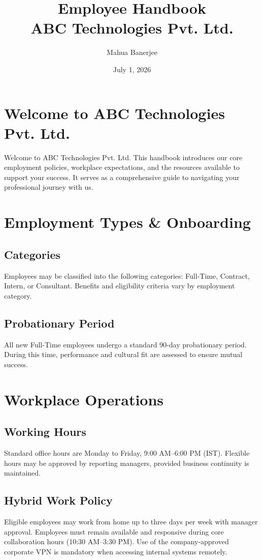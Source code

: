 \documentclass[11pt, a4paper]{article}
\title{\vspace{-2cm}\textbf{\Huge Employee Handbook}\\[0.5cm] \Large ABC Technologies Pvt. Ltd.}
\author{Mahua Banerjee}
\date{July 1, 2026}
\begin{document}
\maketitle
\thispagestyle{empty}

\tableofcontents
\newpage

\section{Welcome to ABC Technologies Pvt. Ltd.}
Welcome to ABC Technologies Pvt. Ltd. This handbook introduces our core employment policies, workplace expectations, and the resources available to support your success. It serves as a comprehensive guide to navigating your professional journey with us.

\section{Employment Types \& Onboarding}
\subsection{Categories}
Employees may be classified into the following categories: Full-Time, Contract, Intern, or Consultant. Benefits and eligibility criteria vary by employment category. 
\subsection{Probationary Period}
All new Full-Time employees undergo a standard 90-day probationary period. During this time, performance and cultural fit are assessed to ensure mutual success.

\section{Workplace Operations}
\subsection{Working Hours}
Standard office hours are Monday to Friday, 9:00 AM–6:00 PM (IST). Flexible hours may be approved by reporting managers, provided business continuity is maintained.
\subsection{Hybrid Work Policy}
Eligible employees may work from home up to three days per week with manager approval. Employees must remain available and responsive during core collaboration hours (10:30 AM–3:30 PM). Use of the company-approved corporate VPN is mandatory when accessing internal systems remotely.
\end{document}
